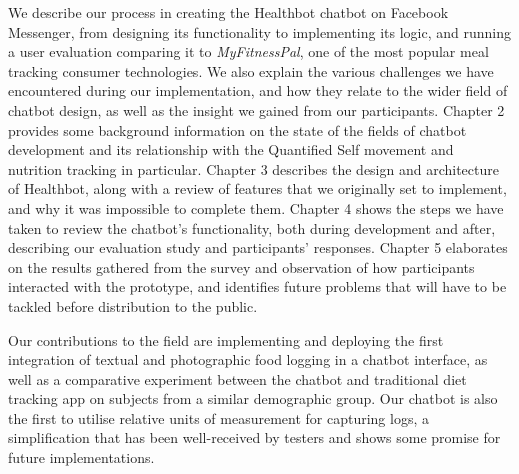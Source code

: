 We describe our process in creating the Healthbot chatbot on Facebook Messenger, from designing its functionality to implementing its logic, and running a user evaluation comparing it to \textit{MyFitnessPal}, one of the most popular meal tracking consumer technologies. We also explain the various challenges we have encountered during our implementation, and how they relate to the wider field of chatbot design, as well as the insight we gained from our participants. Chapter 2 provides some background information on the state of the fields of chatbot development and its relationship with the Quantified Self movement and nutrition tracking in particular. Chapter 3 describes the design and architecture of Healthbot, along with a review of features that we originally set to implement, and why it was impossible to complete them. Chapter 4 shows the steps we have taken to review the chatbot's functionality, both during development and after, describing our evaluation study and participants' responses. Chapter 5 elaborates on the results gathered from the survey and observation of how participants interacted with the prototype, and identifies future problems that will have to be tackled before distribution to the public.

Our contributions to the field are implementing and deploying the first integration of textual and photographic food logging in a chatbot interface, as well as a comparative experiment between the chatbot and traditional diet tracking app on subjects from a similar demographic group. Our chatbot is also the first to utilise relative units of measurement for capturing logs, a simplification that has been well-received by testers and shows some promise for future implementations.
